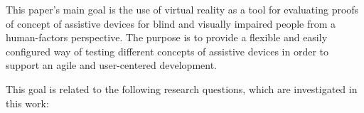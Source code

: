 \label{sec:vr_cabin}


\label{sec:vr_without_vision}


\label{sec:ar_without_vision}


\label{sec:bradley_dunlop}


\label{sec:mental_workload}


\label{sec:situation_awareness}


\label{sec:co_design}


This paper's main goal is the use of virtual reality as a tool for evaluating proofs of concept of assistive devices for blind and visually impaired people from a human-factors perspective. The purpose is to provide a flexible and easily configured way of testing different concepts of assistive devices in order to support an agile and user-centered development.

This goal is related to the following research questions, which are investigated in this work:

